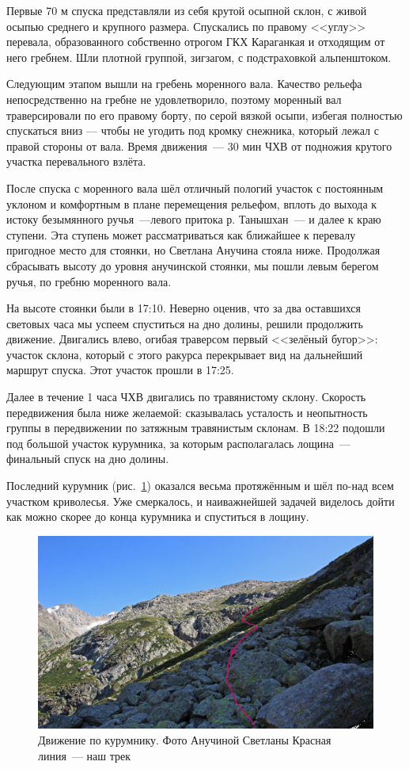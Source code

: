 Первые 70 м спуска представляли из себя крутой осыпной склон, с живой осыпью среднего и крупного размера. Спускались по правому <<углу>> перевала, образованного собственно отрогом ГКХ Караганкая и отходящим от него гребнем. Шли плотной группой, зигзагом, с подстраховкой альпенштоком.  

Следующим этапом вышли на гребень моренного вала. Качество рельефа непосредственно на гребне не удовлетворило, поэтому моренный вал траверсировали по его правому борту, по серой вязкой осыпи, избегая полностью спускаться вниз --- чтобы не угодить под кромку снежника, который лежал с правой стороны от вала. Время движения~--- 30 мин ЧХВ от подножия крутого участка перевального взлёта.

После спуска с моренного вала шёл отличный пологий участок с постоянным уклоном и комфортным в плане перемещения рельефом, вплоть до выхода к истоку безымянного ручья~---левого притока р. Танышхан~--- и далее к краю ступени. Эта ступень может рассматриваться как ближайшее к перевалу пригодное место для стоянки, но Светлана Анучина стояла ниже. Продолжая сбрасывать высоту до уровня анучинской стоянки, мы пошли левым берегом ручья, по гребню моренного вала. 

На высоте стоянки были в 17:10. Неверно оценив, что за два оставшихся световых часа мы успеем спуститься на дно долины, решили продолжить движение. Двигались влево, огибая траверсом первый <<зелёный бугор>>: участок склона, который с этого ракурса перекрывает вид на дальнейший маршрут спуска. Этот участок прошли в 17:25. 

Далее в течение 1 часа ЧХВ двигались по травянистому склону. Скорость передвижения была ниже желаемой: сказывалась усталость и неопытность группы в передвижении по затяжным травянистым склонам. В 18:22 подошли под большой участок курумника, за которым располагалась лощина~--- финальный спуск на дно долины.

Последний курумник (рис.~\ref{fig:peremkurum}) оказался весьма протяжённым и шёл по-над всем участком криволесья. Уже смеркалось, и наиважнейшей задачей виделось дойти как можно скорее до конца курумника и спуститься в лощину. 

\begin{figure}[h!]
	\centering
	\includegraphics[width=0.7\linewidth]{../pics/peremkurum.png}
	\caption{Движение по курумнику. Фото Анучиной Светланы Красная линия~--- наш трек}
	\label{fig:peremkurum}
\end{figure} 

